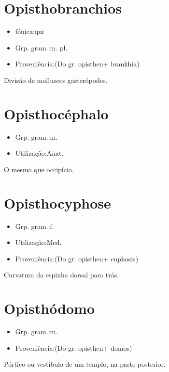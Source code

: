 \section{Opisthobranchios}
\begin{itemize}
\item {fónica:qui}
\end{itemize}
\begin{itemize}
\item {Grp. gram.:m. pl.}
\end{itemize}
\begin{itemize}
\item {Proveniência:(Do gr. \textunderscore opisthen\textunderscore  + \textunderscore brankhia\textunderscore )}
\end{itemize}
Divisão de molluscos gasterópodes.
\section{Opisthocéphalo}
\begin{itemize}
\item {Grp. gram.:m.}
\end{itemize}
\begin{itemize}
\item {Utilização:Anat.}
\end{itemize}
O mesmo que \textunderscore occipício\textunderscore .
\section{Opisthocyphose}
\begin{itemize}
\item {Grp. gram.:f.}
\end{itemize}
\begin{itemize}
\item {Utilização:Med.}
\end{itemize}
\begin{itemize}
\item {Proveniência:(Do gr. \textunderscore opisthen\textunderscore  + \textunderscore cuphosis\textunderscore )}
\end{itemize}
Curvatura da espinha dorsal para trás.
\section{Opisthódomo}
\begin{itemize}
\item {Grp. gram.:m.}
\end{itemize}
\begin{itemize}
\item {Proveniência:(Do gr. \textunderscore opisthen\textunderscore  + \textunderscore domos\textunderscore )}
\end{itemize}
Pórtico ou vestíbulo de um templo, na parte posterior.

